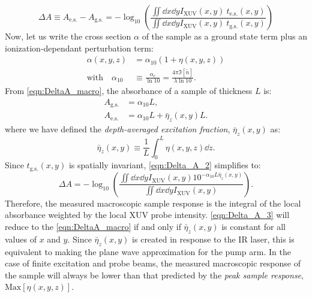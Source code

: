 \begin{equation}
\Delta A \equiv A_{\textrm{e.s.}} - A_{\textrm{g.s.}} = - \log_{10} \left( \frac{\iint \dd{x} \dd{y} I_{\textrm{XUV}}(x,y) \ t_{\textrm{e.s.}}(x,y)}{\iint \dd{x} \dd{y} I_{\textrm{XUV}}(x,y) \ t_{\textrm{g.s.}}(x,y)} \right)
\label{eqn:Delta_A_2}
\end{equation}
Now, let us write the cross section $\alpha$ of the sample as a ground state term plus an ionization-dependant perturbation term:
\begin{equation}
\begin{aligned}
\label{eqn:deltaA_perturbation}
\alpha(x,y,z) &= \alpha_{10} (1 + \eta(x,y,z)) \\
\textrm{with} \quad \alpha_{10} &\equiv \frac{\alpha_e}{\ln 10} = \frac{4 \pi \Im [\tilde{n}]}{\lambda \ln 10}.
\end{aligned}
\end{equation}
From \cref{eqn:DeltaA_macro}, the absorbance of a sample of thickness $L$ is:
\begin{equation}
\begin{aligned}
A_{\textrm{g.s.}} &= \alpha_{10} L, \\
A_{\textrm{e.s.}} &= \alpha_{10} L + \bar{\eta}_z(x,y) L.
\end{aligned}
\end{equation}
where we have defined the \textit{depth-averaged excitation fraction}, $\bar{\eta}_z(x,y)$ as:
\begin{equation}
\bar{\eta}_z(x,y) \equiv \frac{1}{L} \int_{0}^{L} \eta(x,y,z) \dd{z}.
\label{eqn:eta_z}
\end{equation}
Since $t_{\textrm{g.s.}}(x,y)$ is spatially invariant, \cref{eqn:Delta_A_2} simplifies to:
\begin{equation}
\Delta A = -\log_{10} \left( \frac{ \iint \dd{x} \dd{y} I_{\textrm{XUV}}(x,y) 10^{- \alpha_{10} L \bar{\eta}_z(x,y)}}{ \iint \dd{x} \dd{y} I_{\textrm{XUV}}(x,y)} \right).
\label{eqn:Delta_A_3}
\end{equation}
Therefore, the measured macroscopic sample response is the integral of the local absorbance weighted by the local XUV probe intensity. \cref{eqn:Delta_A_3} will reduce to the \cref{eqn:DeltaA_macro} if and only if $\bar{\eta}_z(x,y)$ is constant for all values of $x$ and $y$. Since $\bar{\eta}_z(x,y)$ is created in response to the IR laser, this is equivalent to making the plane wave approximation for the pump arm. In the case of finite excitation and probe beams, the measured macroscopic response of the sample will always be lower than that predicted by the \textit{peak sample response}, $\textrm{Max}[\eta(x,y,z)]$. 

